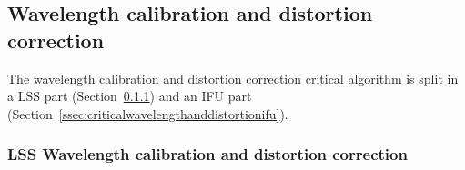 \subsection{Wavelength calibration and distortion correction}\label{ssec:criticalwavelengthanddistortion}
The wavelength calibration and distortion correction critical algorithm is split in a LSS part (Section~\ref{ssec:criticalwavelengthanddistortionlss}) and an IFU part (Section~\ref{ssec:criticalwavelengthanddistortionifu}).

\subsubsection{LSS Wavelength calibration and distortion correction}\label{ssec:criticalwavelengthanddistortionlss}





